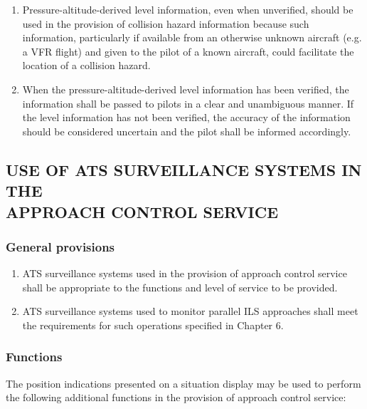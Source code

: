 \begin{enumerate}
    \item Pressure-altitude-derived level information, even when unverified, should be used in the provision of collision hazard information because such information, particularly if available from an otherwise unknown aircraft (e.g. a VFR flight) and given to the pilot of a known aircraft, could facilitate the location of a collision hazard.
    \item When the pressure-altitude-derived level information has been verified, the information shall be passed to pilots in a clear and unambiguous manner. If the level information has not been verified, the accuracy of the information should be considered uncertain and the pilot shall be informed accordingly.
\end{enumerate}


\subsection[Use of ATS surveillance systems in the approach control service]{USE OF ATS SURVEILLANCE SYSTEMS IN THE \\ APPROACH CONTROL SERVICE} \label{8.9}

\subsubsection{General provisions}

\begin{enumerate}
    \item ATS surveillance systems used in the provision of approach control service shall be appropriate to the functions and level of service to be provided.
    \item ATS surveillance systems used to monitor parallel ILS approaches shall meet the requirements for such operations specified in Chapter 6.
\end{enumerate}

\subsubsection{Functions}

The position indications presented on a situation display may be used to perform the following additional functions in the provision of approach control service:

